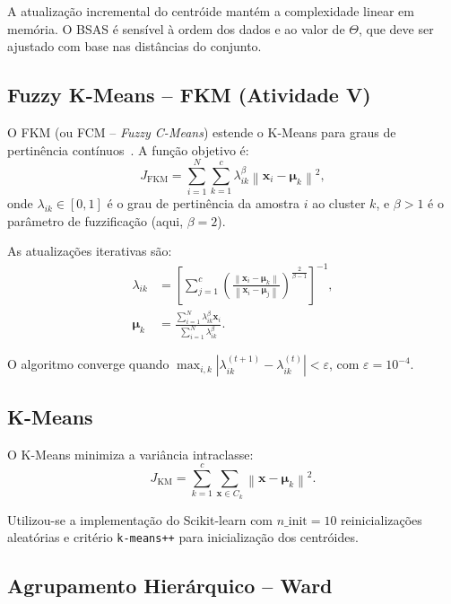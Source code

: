 \documentclass[12pt, a4paper]{article}
\newcommand{\bx}{\mathbf{x}}
\newcommand{\bmu}{\boldsymbol{\mu}}
\newcommand{\norm}[1]{\left\lVert#1\right\rVert}
\begin{document}
A atualização incremental do centróide mantém a complexidade linear em memória. O BSAS é sensível à ordem dos dados e ao valor de $\Theta$, que deve ser ajustado com base nas distâncias do conjunto.

\subsection{Fuzzy K-Means -- FKM (Atividade V)}
\label{sec:fkm}

O FKM (ou FCM -- \emph{Fuzzy C-Means}) estende o K-Means para graus de pertinência contínuos~\cite{theodoridis2008}. A função objetivo é:
\begin{equation}
    J_{\text{FKM}} = \sum_{i=1}^{N} \sum_{k=1}^{c} \lambda_{ik}^\beta \norm{\bx_i - \bmu_k}^2,
    \label{eq:fkm_obj}
\end{equation}
onde $\lambda_{ik} \in [0,1]$ é o grau de pertinência da amostra $i$ ao cluster $k$, e $\beta > 1$ é o parâmetro de fuzzificação (aqui, $\beta = 2$).

As atualizações iterativas são:
\begin{align}
    \lambda_{ik} &= \left[\sum_{j=1}^{c} \left(\frac{\norm{\bx_i - \bmu_k}}{\norm{\bx_i - \bmu_j}}\right)^{\!\frac{2}{\beta-1}}\right]^{-1}, \label{eq:fkm_lambda} \\
    \bmu_k &= \frac{\sum_{i=1}^{N} \lambda_{ik}^\beta \bx_i}{\sum_{i=1}^{N} \lambda_{ik}^\beta}. \label{eq:fkm_mu}
\end{align}

O algoritmo converge quando $\max_{i,k} |\lambda_{ik}^{(t+1)} - \lambda_{ik}^{(t)}| < \varepsilon$, com $\varepsilon = 10^{-4}$.

\subsection{K-Means}
\label{sec:kmeans}

O K-Means minimiza a variância intraclasse:
\begin{equation}
    J_{\text{KM}} = \sum_{k=1}^{c} \sum_{\bx \in C_k} \norm{\bx - \bmu_k}^2.
    \label{eq:kmeans_obj}
\end{equation}

Utilizou-se a implementação do Scikit-learn com $n\_\text{init} = 10$ reinicializações aleatórias e critério \texttt{k-means++} para inicialização dos centróides.

\subsection{Agrupamento Hierárquico -- Ward}
\label{sec:ward}
\end{document}

